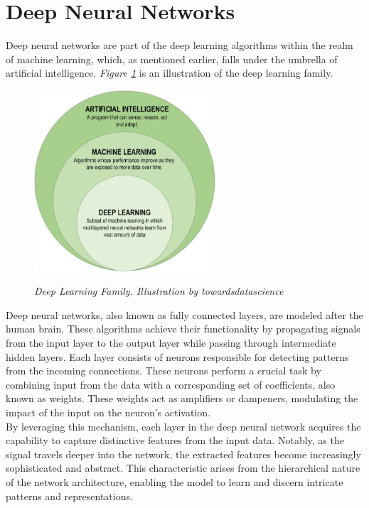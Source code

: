 \section{Deep Neural Networks}

Deep neural networks are part of the deep learning algorithms within the realm of machine learning, which, as mentioned earlier, falls under the umbrella of artificial intelligence. \textit{Figure \ref{fig:deep-learning-family}} is an illustration of the deep learning family. \\

\begin{figure}[H]
\centering
\includegraphics[width=0.6\textwidth]{imatges/preliminaries/deep-learning-familiy.png}
\caption[Deep Learning Family]{\textit{Deep Learning Family. Illustration by towardsdatascience}}
{\label{fig:deep-learning-family}}
\end{figure}

Deep neural networks, also known as fully connected layers, are modeled after the human brain. These algorithms achieve their functionality by propagating signals from the input layer to the output layer while passing through intermediate hidden layers. Each layer consists of neurons responsible for detecting patterns from the incoming connections. These neurons perform a crucial task by combining input from the data with a corresponding set of coefficients, also known as weights. These weights act as amplifiers or dampeners, modulating the impact of the input on the neuron's activation. \\

By leveraging this mechanism, each layer in the deep neural network acquires the capability to capture distinctive features from the input data. Notably, as the signal travels deeper into the network, the extracted features become increasingly sophisticated and abstract. This characteristic arises from the hierarchical nature of the network architecture, enabling the model to learn and discern intricate patterns and representations. \\

